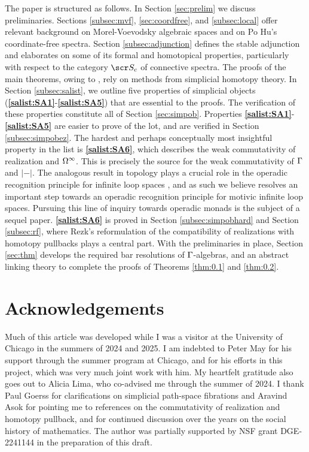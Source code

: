 \documentclass{amsart}
\theoremstyle{definition}
\begin{document}
The paper is structured as follows. In Section \ref{sec:prelim} we discuss preliminaries. Sections \ref{subsec:mvf}, \ref{sec:coordfree}, and \ref{subsec:local} offer relevant background on Morel-Voevodsky algebraic spaces and on Po Hu's coordinate-free spectra. Section \ref{subsec:adjunction} defines the stable adjunction and elaborates on some of its formal and homotopical properties, particularly with respect to the category $\sS_c$ of connective spectra.
The proofs of the main theorems, owing to \cite{KMZ25}, rely on methods from simplicial homotopy theory. In Section \ref{subsec:salist}, we outline five properties of simplicial objects (\textbf{\ref{salist:SA1}}-\textbf{\ref{salist:SA5}}) that are essential to the proofs. The verification of these properties constitute all of Section \ref{sec:simpob}.
Properties \textbf{\ref{salist:SA1}}-\textbf{\ref{salist:SA5}} are easier to prove of the lot, and are verified in Section \ref{subsec:simpobez}. The hardest and perhaps conceptually most insightful property in the list is \textbf{\ref{salist:SA6}}, which describes the weak commutativity of realization and $\Omega^{\infty}$. This is precisely the source for the weak commutativity of $\Gamma$ and $|-|$. The analogous result in topology plays a crucial role in the operadic recognition principle for infinite loop spaces \cite{May72}, and as such we believe
resolves an important step towards an operadic recognition principle for motivic infinite loop spaces. Pursuing this line of inquiry towards operadic monads is the subject of a sequel paper. \textbf{\ref{salist:SA6}} is proved in Section \ref{subsec:simpobhard} and Section \ref{subsec:rf}, where Rezk's reformulation of the compatibility of realizations with homotopy pullbacks \cite{Rezk14} plays a central part.
With the preliminaries in place, Section \ref{sec:thm} develops the required bar resolutions of $\Gamma$-algebras, and an abstract linking theory to complete the proofs of Theorems \ref{thm:0.1} and \ref{thm:0.2}. 




\section*{Acknowledgements}
Much of this article was developed while I was a visitor at the University of Chicago in the summers of 2024 and 2025. 
I am indebted to Peter May for his support through the summer program at Chicago, and for his efforts in this project, which was very much joint work with him.
My heartfelt gratitude also goes out to Alicia Lima, who co-advised me through the summer of 2024. I thank Paul Goerss for clarifications on simplicial path-space fibrations and Aravind Asok for pointing me to references on the commutativity of realization and homotopy pullback, and for continued discussion over the years on the social history of mathematics. 
The author was partially supported by NSF grant DGE-2241144 in the preparation of this draft.
\end{document}
